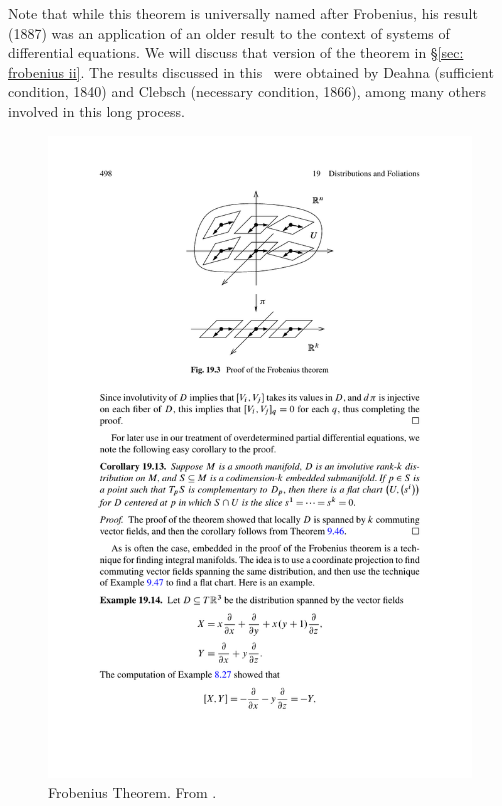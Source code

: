 \begin{hrem*}
    Note that while this theorem is universally named after Frobenius, his result (1887) was an application of an older result to the context of systems of differential equations. We will discuss that version of the theorem in \S\ref{sec: frobenius ii}. The results discussed in this \subsect\ were obtained by Deahna (sufficient condition, 1840) and Clebsch (necessary condition, 1866), among many others involved in this long process.
\end{hrem*}

\begin{figure}
    \centering
    \includegraphics[scale=0.8]{figures/frobenius_1.pdf}
    \caption{Frobenius Theorem. From \cite{Lee}.}
    \label{fig: frobenius1}
\end{figure}

